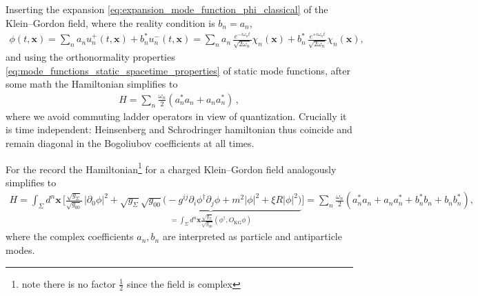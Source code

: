 \documentclass[../QFT_main.tex]{subfiles}
\begin{document}
\begin{mytheorem}
Inserting the expansion \eqref{eq:expansion_mode_function_phi_classical} of the Klein--Gordon field, where the reality condition is $b_n = a_n$, 
{\small\begin{align}
    \phi(t,\mathbf{x}) = \sum_n a_n u_n^+(t,\mathbf{x}) + b_n^* u_n^-(t,\mathbf{x}) = \sum_n a_n\, \frac{e^{-i\omega_n t}}{\sqrt{2\omega_n}} \chi_n(\mathbf{x}) + b_n^* \,\frac{e^{+i\omega_n t}}{\sqrt{2\omega_n}} \chi_n(\mathbf{x}),
\end{align}}
and using the orthonormality properties \eqref{eq:mode_functions_static_spacetime_properties} of static mode functions, after some math the Hamiltonian simplifies to
{\small\begin{align}
    H= \sum_n \tfrac{\omega_n}{2}(a_n^* a_n + a_na_n^*)\,,
\end{align}}
where we avoid commuting ladder operators in view of quantization.
Crucially it is time independent: Heinsenberg and Schrodringer hamiltonian thus coincide and remain diagonal in the Bogoliubov coefficients at all times.

For the record the Hamiltonian\footnote{note there is no factor $\tfrac12$ since the field is complex} for a charged Klein--Gordon field analogously simplifies to
{\small\begin{align}
    H=\int_\Sigma\!\! d^n\mathbf{x}\, \bigg[\tfrac{\sqrt{g_\Sigma}}{\sqrt{g_{00}}}\, \big|\partial_0 \phi\big|^2 + \underbrace{\sqrt{g_\Sigma}\sqrt{g_{00}}\big( -g^{ij} \partial_i \phi^\dagger \partial_j \phi + m^2|\phi|^2 + \xi R |\phi|^2\big)}_{{\displaystyle =\int_\Sigma\!\!d^n\mathbf{x}\tfrac{\sqrt{g_\Sigma}}{\sqrt{g_{00}}}(\phi^\dagger,O_{\mathrm{KG}}\phi)}}\bigg] 
    = \sum_n \tfrac{\omega_n}{2} (a_n^* a_n +a_n a_n^* + b_n^* b_n+b_n b_n^*),
\end{align}}
where the complex coefficients $a_n, b_n$ are interpreted as particle and antiparticle modes.
\end{mytheorem}
\end{document}
